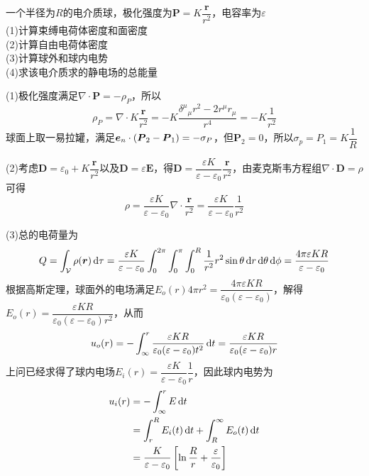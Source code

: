 \documentclass{mynote}
\begin{document}
\begin{exercise}{2.1}
    一个半径为$R$的电介质球，极化强度为$\bm{P} = K \dfrac{\bm{r}}{r^2}$，电容率为$\varepsilon$ \\
    (1)计算束缚电荷体密度和面密度 \\
    (2)计算自由电荷体密度\\
    (3)计算球外和球内电势\\
    (4)求该电介质求的静电场的总能量
\end{exercise}
\begin{solution}
(1)极化强度满足$\nabla \cdot \bm{P} = - \rho_P $，所以
\[
\rho_P = \nabla \cdot K \frac{\bm{r}}{r^2} = -K \frac{{\delta^{\mu}}_{\mu} r^2 - 2r^{\mu}r_{\mu}}{r^4} = -K \frac{1}{r^2}    
\]
球面上取一易拉罐，满足$\boldsymbol{e}_n \cdot (\boldsymbol{P}_2 - \boldsymbol{P}_1) = -\sigma_P$，但$\bm{P}_2 = 0$，所以$\sigma_p = P_1 = K \dfrac{1}{R}$

(2)考虑$\bm{D} = \varepsilon_0 + K \dfrac{\bm{r}}{r^2}$以及$\bm{D} = \varepsilon \bm{E}$，得$\bm{D} = \dfrac{\varepsilon K}{\varepsilon - \varepsilon_0} \dfrac{\bm{r}}{r^2}$，由麦克斯韦方程组$\nabla \cdot \bm{D} = \rho$可得
\[
\rho = \dfrac{\varepsilon K}{\varepsilon - \varepsilon_0}  \nabla \cdot \dfrac{\bm{r}}{r^2} = \dfrac{\varepsilon K}{\varepsilon - \varepsilon_0} \frac{1}{r^2}
\]

(3)总的电荷量为
\[
Q = \int_{\mathcal{V}} \rho(\boldsymbol{r}) \mathop{}\!\mathrm{d} \tau = \dfrac{\varepsilon K}{\varepsilon - \varepsilon_0} \int_{0}^{2 \pi} \int_{0}^{\pi} \int_{0}^{R} \frac{1}{r^2} r^2 \sin \theta  \mathop{}\!\mathrm{d} r \mathop{}\!\mathrm{d} \theta \mathop{}\!\mathrm{d} \phi = \frac{4\pi \varepsilon K R}{\varepsilon - \varepsilon_0}
\]
根据高斯定理，球面外的电场满足$E_o(r) 4 \pi r^2 = \dfrac{4\pi \varepsilon K R}{\varepsilon_0 (\varepsilon - \varepsilon_0)}$，解得$E_o(r) = \dfrac{\varepsilon K R}{\varepsilon_0(\varepsilon - \varepsilon_0) r^2}$，从而
\[
u_o(r) = -\int_{\infty}^r \dfrac{\varepsilon K R}{\varepsilon_0(\varepsilon - \varepsilon_0) t^2} \mathop{}\!\mathrm{d} t = \dfrac{\varepsilon K R}{\varepsilon_0(\varepsilon - \varepsilon_0) r}
\]
上问已经求得了球内电场$E_i(r) = \dfrac{\varepsilon K}{\varepsilon - \varepsilon_0} \dfrac{1}{r}$，因此球内电势为
\begin{align*}
    u_i(r) &= -\int_{\infty}^{r} E \mathop{}\!\mathrm{d} t\\
&= \int_{r}^{R} E_i(t) \mathop{}\!\mathrm{d} t + \int_{R}^{\infty} E_o(t) \mathop{}\!\mathrm{d} t \\
&= \frac{K}{\varepsilon - \varepsilon_0} \left[ \ln \frac{R}{r} + \frac{\varepsilon}{\varepsilon_0} \right]
\end{align*}


\end{solution}
\end{document}
